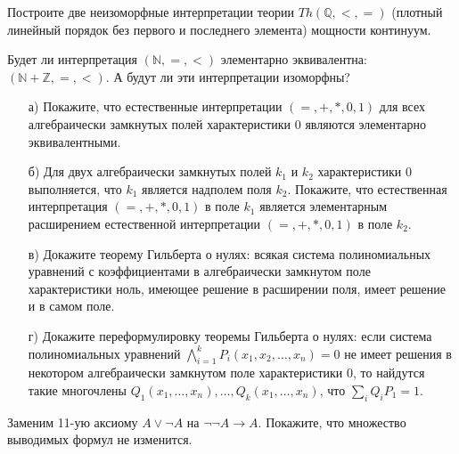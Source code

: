 \begin{task}
    Построите две неизоморфные интерпретации теории $Th(\mathbb{Q}, <, =)$ (плотный линейный порядок без первого и последнего
    элемента) мощности континуум.
\end{task}


\breakline

\begin{ptask}{51}
    Будет ли интерпретация $(\mathbb{N}, =, <)$ элементарно эквивалентна: $(\mathbb{N} + \mathbb{Z}, =, <)$. А будут ли эти
    интерпретации изоморфны?
\end{ptask}

\begin{ptask}{53}
    \begin{enumerate}[topsep = 0pt, itemsep = -1ex]
        \item [а)] Покажите, что естественные интерпретации $(=, +, *, 0, 1)$ для всех алгебраически замкнутых полей
			характеристики $0$ являются элементарно эквивалентными.
        \item [б)] Для двух алгебраически замкнутых полей $k_1$ и $k_2$ характеристики $0$ выполняется, что $k_1$ является
		    надполем поля $k_2$. Покажите, что естественная интерпретация $(=, +, *, 0, 1)$ в поле $k_1$ является элементарным
            расширением естественной интерпретации $(=, +, *, 0, 1)$ в поле $k_2$.
        \item [в)] Докажите теорему Гильберта о нулях: всякая система полиномиальных уравнений с коэффициентами в алгебраически
			замкнутом поле характеристики ноль, имеющее решение в расширении поля, имеет решение и в самом поле.
        \item [г)] Докажите переформулировку теоремы Гильберта о нулях: если система полиномиальных уравнений
        	$\bigwedge\limits_{i = 1}^k P_i(x_1, x_2, \dots, x_n) = 0$ не имеет решения в некотором алгебраически замкнутом поле
            характеристики $0$, то найдутся такие многочлены $Q_1(x_1, \dots, x_n), \dots, Q_k(x_1, \dots, x_n)$, что
            $\sum\limits_i Q_i P_1 = 1$.
    \end{enumerate}
\end{ptask}

\begin{ptask}{58}
	Заменим 11-ую аксиому $A \lor \lnot A$ на $\lnot \lnot A \to A$. Покажите, что множество выводимых формул не изменится.
\end{ptask}

